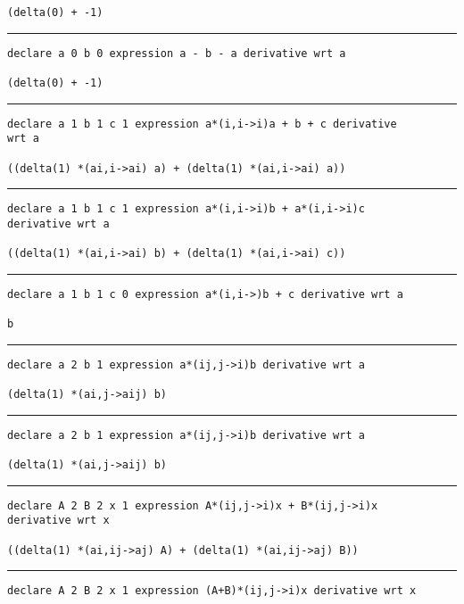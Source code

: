 \documentclass[12pt, a4paper]{report}
\begin{document}
\begin{multicols}{2}
\begin{verbatim}
(delta(0) + -1)
\end{verbatim}
\vspace{-20pt} \rule[-10pt]{\columnwidth}{0.1pt} 
\begin{verbatim}
declare a 0 b 0 expression a - b - a derivative wrt a

(delta(0) + -1)
\end{verbatim}
\vspace{-20pt} \rule[-10pt]{\columnwidth}{0.1pt} 
\begin{verbatim}
declare a 1 b 1 c 1 expression a*(i,i->i)a + b + c derivative 
wrt a

((delta(1) *(ai,i->ai) a) + (delta(1) *(ai,i->ai) a))
\end{verbatim}
\vspace{-20pt} \rule[-10pt]{\columnwidth}{0.1pt} 
\begin{verbatim}
declare a 1 b 1 c 1 expression a*(i,i->i)b + a*(i,i->i)c 
derivative wrt a

((delta(1) *(ai,i->ai) b) + (delta(1) *(ai,i->ai) c))
\end{verbatim}
\vspace{-20pt} \rule[-10pt]{\columnwidth}{0.1pt} 
\begin{verbatim}
declare a 1 b 1 c 0 expression a*(i,i->)b + c derivative wrt a

b
\end{verbatim}
\vspace{-20pt} \rule[-10pt]{\columnwidth}{0.1pt} 
\begin{verbatim}
declare a 2 b 1 expression a*(ij,j->i)b derivative wrt a

(delta(1) *(ai,j->aij) b)
\end{verbatim}
\vspace{-20pt} \rule[-10pt]{\columnwidth}{0.1pt} 
\begin{verbatim}
declare a 2 b 1 expression a*(ij,j->i)b derivative wrt a

(delta(1) *(ai,j->aij) b)
\end{verbatim}
\vspace{-20pt} \rule[-10pt]{\columnwidth}{0.1pt} 
\begin{verbatim}
declare A 2 B 2 x 1 expression A*(ij,j->i)x + B*(ij,j->i)x 
derivative wrt x

((delta(1) *(ai,ij->aj) A) + (delta(1) *(ai,ij->aj) B))
\end{verbatim}
\vspace{-20pt} \rule[-10pt]{\columnwidth}{0.1pt} 
\begin{verbatim}
declare A 2 B 2 x 1 expression (A+B)*(ij,j->i)x derivative wrt x


\end{verbatim}
\end{multicols}
\end{document}
